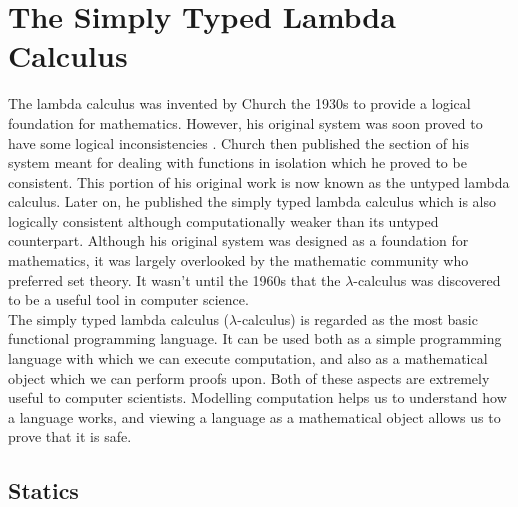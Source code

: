 \chapter{The Simply Typed Lambda Calculus}
\label{chap: stlc}

The lambda calculus was invented by Church the 1930s \cite{church1932} to provide a logical foundation for 
mathematics. However, his original system was soon proved to have some logical inconsistencies \cite{kleene1935}. 
Church then published the section of his system meant for dealing with functions in isolation 
which he proved to be consistent. This portion of his original work is now known as the untyped 
lambda calculus. Later on, he published the simply typed lambda calculus \cite{church1940} which is also logically 
consistent although computationally weaker than its untyped counterpart. Although his original 
system was designed as a foundation for mathematics, it was largely overlooked by the mathematic 
community who preferred set theory. It wasn't until the 1960s that the $\lambda$-calculus was 
discovered to be a useful tool in computer science. \\

\noindent
The simply typed lambda calculus ($\lambda$-calculus) is regarded as the most basic functional programming language. 
It can be used both as a simple programming language with which we can execute computation, and 
also as a mathematical object which we can perform proofs upon. Both of these aspects are 
extremely useful to computer scientists. Modelling computation helps us to understand how a 
language works, and viewing a language as a mathematical object allows us to prove that it 
is safe. 

\section{Statics}

